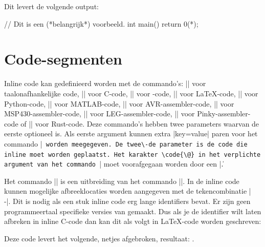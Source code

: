 Dit levert de volgende output:
\begin{lstfragment}[style=cstyle,escapeinside={(*}{*)}]
// Dit is een (*\textcolor{hrred}{belangrijk}*) voorbeeld.
int main() {
	return 0(*\footnotemark*);
}
\end{lstfragment}

\section{Code-segmenten}
Inline code kan gedefinieerd worden met de commando's: |\code| voor taalonafhankelijke code, |\ccode| voor C-code, |\cppcode| voor \Cpp{}-code, |\lcode| voor \LaTeX\hyp{}code, |\pycode| voor Python\hyp{}code, |\mcode| voor MATLAB\hyp{}code, |\acode| voor AVR\hyp{}assembler\hyp{}code, |\amcode| voor MSP430\hyp{}assembler\hyp{}code, |\legcode| voor LEG\hyp{}assembler\hyp{}code, |\pinkycode| voor Pinky\hyp{}assembler\hyp{}code of |\rcode| voor Rust\hyp{}code.
Deze commando's hebben twee parameters waarvan de eerste optioneel is.
Als eerste argument kunnen extra |key=value| paren voor het commando |\lstinline| worden meegegeven.
De twee\-de parameter is de code die inline moet worden geplaatst.
Het karakter \code{\@} in het verplichte argument van het commando |\code| moet voorafgegaan worden door een |\|.

Het commando |\hcode| is een uitbreiding van het commando |\code|.
In de inline code kunnen mogelijke afbreeklocaties worden aangegeven met de tekencombinatie |\\-|.
Dit is nodig als een stuk inline code erg lange identifiers bevat.
Er zijn geen programmeertaal specifieke versies van gemaakt.
Dus als je de identifier  wilt laten afbreken in inline C-code dan kan dit als volgt in \LaTeX{}-code worden geschreven:
\begin{lstfragment}[style = lstyle]
\end{lstfragment}
Deze code levert het volgende, netjes afgebroken, resultaat: .

